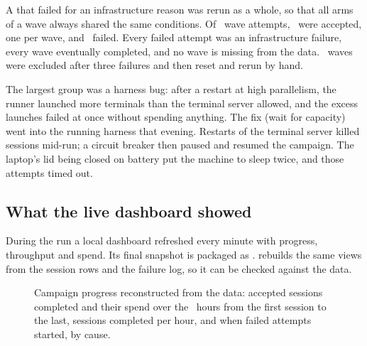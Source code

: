 A  that failed for an infrastructure reason was rerun as a whole, so that all arms of a
wave always shared the same conditions. Of \NAttempts\ wave attempts, \NWaves\ were accepted, one per wave,
and \NFailed\ failed. Every failed attempt was an infrastructure failure, every wave eventually completed,
and no wave is missing from the data. \NWavesReset\ waves were excluded after three failures and then reset
and rerun by hand.

\begin{table}[htbp]
\centering\small
\caption{Failed wave attempts by cause. For \NFailedInferred\ of them the cause was not recorded at the time
and is inferred from timing.}
\label{tab:failures}

\end{table}

The largest group was a harness bug: after a restart at high parallelism, the runner launched more
terminals than the terminal server allowed, and the excess launches failed at once without spending
anything. The fix (wait for capacity) went into the running harness that evening. Restarts of the terminal
server killed sessions mid-run; a circuit breaker then paused and resumed the campaign. The laptop's lid
being closed on battery put the machine to sleep twice, and those attempts timed out.

\subsection{What the live dashboard showed}

During the run a local dashboard refreshed every minute with progress, throughput and spend. Its final snapshot
is packaged as .  rebuilds the same views from the session rows and
the failure log, so it can be checked against the data.

\begin{figure}[htbp]
\centering
{}\par\smallskip

\caption{Campaign progress reconstructed from the data: accepted sessions completed and their spend over the
\ProgressHours\ hours from the first session to the last, sessions completed per hour, and when failed attempts
started, by cause.}
\label{fig:progress}
\end{figure}

